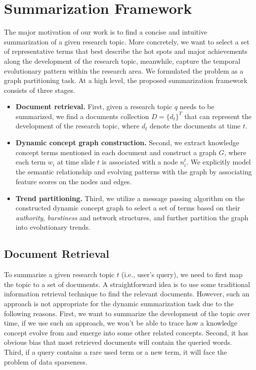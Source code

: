 \section{Summarization Framework}
\label{sec:algorithm}

The major motivation of our work is to find a concise and intuitive summarization of a given research topic. More concretely, we want to select a set of representative terms that best describe the hot spots and major achievements along the development of the research topic, meanwhile, capture the temporal evolutionary pattern within the research area. We formulated the problem as a graph partitioning task. At a high level, the proposed summarization framework consists of three stages.

\begin{itemize}
    \item {\bf Document retrieval.} First, given a research topic $q$ needs to be summarized, we find a documents collection $D = \{d_t\}^T$ that can represent the development of the research topic, where $d_t$ denote the documents at time $t$.
    
    \item {\bf Dynamic concept graph construction.}  
    Second, we extract knowledge concept terms mentioned in each document and construct a graph $G$, where each term $w_i$ at time slide $t$ is associated with a node $n_i^t$. We explicitly model the semantic relationship and evolving patterns with the graph by associating feature scores on the nodes and edges.
    
    \item {\bf Trend partitioning.} Third, we utilize a message passing algorithm on the constructed dynamic concept graph to select a set of terms based on their \emph{authority}, \emph{burstiness} and network structures, and further partition the graph into evolutionary trends.
\end{itemize}

\subsection{Document Retrieval}

To summarize a given research topic $t$ (i.e., user's query), we need to first map the topic to a set of documents. A straightforward idea is to use some traditional information retrieval technique to find the relevant documents. However, such an approach is not appropriate for the dynamic summarization task due to the following reasons. First, we want to summarize the development of the topic over time, if we use such an approach, we won't be able to trace how a knowledge concept evolve from and emerge into some other related concepts. Second, it has obvious bias that most retrieved documents will contain the queried words. Third, if a query contains a rare used term or a new term, it will face the problem of data sparseness. 

